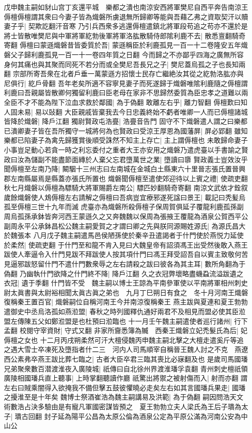 戊申魏主嗣如豺山宫丁亥還平城　樂都之潰也南涼安西將軍樊尼自西平奔告南涼王傉檀傉檀謂其衆曰今妻子皆為熾磐所虜退無所歸卿等能與吾藉乙弗之資取契汗以贖妻子乎|{
	契欺訖翻汗音寒}
乃引兵西衆多逃還傉檀遣鎮北將軍段苟追之苟亦不還於是將士皆散唯樊尼與中軍將軍紇勃後軍將軍洛肱散騎侍郎隂利鹿不去|{
	散悉亶翻騎奇寄翻}
傉檀曰蒙遜熾磐昔皆委質於吾|{
	蒙遜稱臣於利鹿孤見一百一十二卷隆安五年熾磐父子歸利鹿孤見一百一十一卷四年質之日翻}
今而歸之不亦鄙乎四海之廣無所容身何其痛也與其聚而同死不若分而或全樊尼吾長兄之子|{
	樊尼蓋烏孤之子也長知兩翻}
宗部所寄吾衆在北者戶垂一萬蒙遜方招懷士民存亡繼絶汝其從之紇勃洛肱亦與尼俱行|{
	紇戶骨翻}
吾年老矣所適不容寧見妻子而死遂歸于熾磐唯隂利鹿隨之傉檀謂利鹿曰吾親屬皆散卿何獨留利鹿曰臣老母在家非不思歸然委質為臣忠孝之道難以兩全臣不才不能為陛下泣血求救於鄰國|{
	為于偽翻}
敢離左右乎|{
	離力智翻}
傉檀歎曰知人固未易|{
	易以䜴翻}
大臣親戚皆棄我去今日忠義終始不虧者唯卿一人而已傉檀諸城皆降於熾磐|{
	降戶江翻}
獨尉賢政屯浩亹|{
	浩亹音告門}
固守不下熾磐遣人謂之曰樂都已潰卿妻子皆在吾所獨守一城將何為也賢政曰受涼王厚恩為國藩屏|{
	屏必郢翻}
雖知樂都已陷妻子為禽先歸獲賞後順受誅然不知主上存亡|{
	主上謂傉檀也}
未敢歸命妻子小事豈足動心若貪一時之利忘委付之重者大王亦安用之熾磐乃遣虎臺以手書諭之賢政曰汝為儲副不能盡節面縳於人棄父忘君墮萬世之業|{
	墮讀曰隳}
賢政義士豈效汝乎聞傉檀至左南乃降|{
	闞駰十三州志曰左南城在金城白土縣東六十里晉志張氏置晉興郡左南縣屬焉是縣蓋亦張氏所置也}
熾磐聞傉檀至遣使郊迎待以上賓之禮|{
	使疏吏翻}
秋七月熾磐以傉檀為驃騎大將軍賜爵左南公|{
	驃匹妙翻騎奇寄翻}
南涼文武依才銓叙歲餘熾磐使人鴆傉檀左右請解之傉檀曰吾病豈宜療邪遂死諡曰景王|{
	載記曰秃髪烏孤至傉檀三世十九年而滅}
虎臺亦為熾磐所殺傉檀子保周賀俱延子覆龍利鹿孤孫副周烏孤孫承鉢皆奔河西王蒙遜久之又奔魏魏以保周為張掖王覆龍為酒泉公賀西平公副周永平公承鉢昌松公魏主嗣愛賀之才謂曰卿之先與朕同源賜姓源氏|{
	為源氏昌大於魏張本}
八月戊子魏主嗣遣馬邑侯陋孫使於秦辛丑遣謁者于什門使於燕悦力延使於柔然|{
	使疏吏翻}
于什門至和龍不肯入見曰大魏皇帝有詔須馮王出受然後敢入燕王跋使人牽逼令入什門見跋不拜跋使人按其項什門曰馮王拜受詔吾自以賓主致敬何苦見逼邪跋怒留什門不遣什門數衆辱之左右請殺之跋曰彼各為其主耳|{
	數所角翻為于偽翻}
乃幽執什門欲降之什門終不降|{
	降戶江翻}
久之衣冠弊壞略盡蟣蝨流溢跋遺之衣冠|{
	遺于季翻}
什門皆不受　魏主嗣以博士王諒為平南參軍使以平南將軍相州刺史尉太眞書與太尉裕相聞太眞古眞之弟也　九月丁巳朔日有食之　冬十月河南王熾磐復稱秦王置百官|{
	熾磐嗣位自稱河南王今并南涼復稱秦王}
燕主跋與夏連和夏王勃勃遣御史中丞烏洛孤如燕涖盟|{
	春秋之時列國釋仇通好兩君不及相見而盟必使其臣涖盟左傳陳五父如鄭涖盟是也杜預曰涖臨也}
十一月壬午魏主嗣遣使者巡行諸州|{
	行下孟翻}
校閱守宰資財|{
	守式又翻}
非家所齎悉簿為贓　西秦王熾磐立妃禿髮氏為后|{
	妃傉檀之女也}
十二月丙戌朔柔然可汗大檀侵魏丙申魏主嗣北擊之大檀走遣奚斤等追之遇大雪士卒凍死及墮指者什二三　河内人司馬順宰自稱晉王魏人討之不克　燕遼西公素弗卒燕王跋比葬七臨之|{
	古者大臣卒君三臨其喪比必寐翻及也}
是歲司馬國璠兄弟聚衆數百潜渡淮夜入廣陵城|{
	祇傳曰自北徐州界渡淮璠孚袁翻}
青州刺史檀祇領廣陵相國璠兵直上聽事|{
	上時掌翻聽讀作廳}
祇驚出將禦之被射傷而入|{
	射而亦翻}
謂左右曰賊乘闇得入欲掩我不備但擊五鼓彼懼曉必走矣左右如其言國璠兵果走|{
	國璠之擾淮至是十年矣}
魏博士祭酒崔浩為魏主嗣講易及洪範|{
	為于偽翻}
嗣因問浩天文術數浩占決多驗由是有寵凡軍國密謀皆預之　夏王勃勃立夫人梁氏為王后子璝為太子|{
	璝古回翻}
封子延為陽平公昌為太原公倫為酒泉公定為平原公滿為河南公安為中山公

